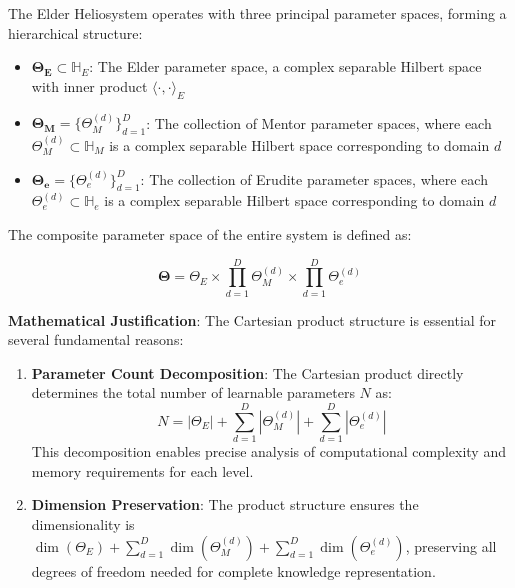 \begin{definition}
The Elder Heliosystem operates with three principal parameter spaces, forming a hierarchical structure:

\begin{itemize}
    \item $\boldsymbol{\Theta_E} \subset \mathbb{H}_E$: The Elder parameter space, a complex separable Hilbert space with inner product $\langle \cdot, \cdot \rangle_E$
    
    \item $\boldsymbol{\Theta_M} = \{\Theta_M^{(d)}\}_{d=1}^D$: The collection of Mentor parameter spaces, where each $\Theta_M^{(d)} \subset \mathbb{H}_M$ is a complex separable Hilbert space corresponding to domain $d$
    
    \item $\boldsymbol{\Theta_e} = \{\Theta_e^{(d)}\}_{d=1}^D$: The collection of Erudite parameter spaces, where each $\Theta_e^{(d)} \subset \mathbb{H}_e$ is a complex separable Hilbert space corresponding to domain $d$
\end{itemize}

The composite parameter space of the entire system is defined as:

\begin{equation}
\boldsymbol{\Theta} = \Theta_E \times \prod_{d=1}^D \Theta_M^{(d)} \times \prod_{d=1}^D \Theta_e^{(d)}
\end{equation}

\textbf{Mathematical Justification}: The Cartesian product structure is essential for several fundamental reasons:
\begin{enumerate}
    \item \textbf{Parameter Count Decomposition}: The Cartesian product directly determines the total number of learnable parameters $N$ as:
    \begin{equation}
    N = |\Theta_E| + \sum_{d=1}^D |\Theta_M^{(d)}| + \sum_{d=1}^D |\Theta_e^{(d)}|
    \end{equation}
    This decomposition enables precise analysis of computational complexity and memory requirements for each level.
    
    \item \textbf{Dimension Preservation}: The product structure ensures the dimensionality is $\dim(\Theta_E) + \sum_{d=1}^D \dim(\Theta_M^{(d)}) + \sum_{d=1}^D \dim(\Theta_e^{(d)})$, preserving all degrees of freedom needed for complete knowledge representation.
    

\end{enumerate}
\end{definition}
